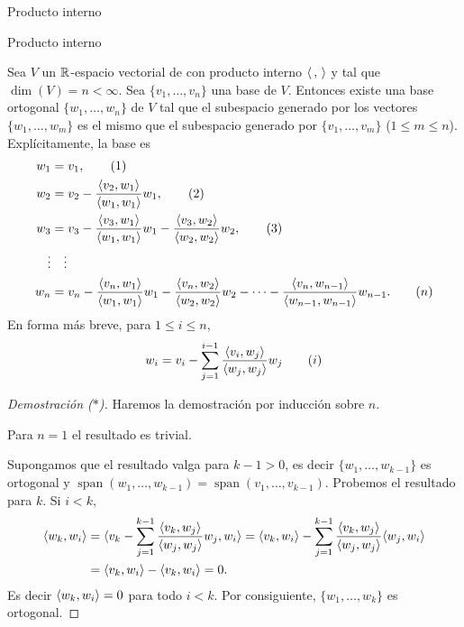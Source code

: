 \begin{chapter}{Producto interno}
\begin{section}{Producto interno}
        \begin{proposicion}
            Sea $V$  un $\mathbb R$-espacio vectorial de con producto interno $\langle \,,\,\rangle$ y tal que $\dim(V) = n < \infty$. 
            Sea $\{v_1,\ldots,v_n\}$ una base de $V$. Entonces existe una base ortogonal $\{w_1,\ldots, w_n\}$ de $V$ tal que el subespacio generado por los vectores $\{w_1,\ldots, w_m\}$ es el mismo que el subespacio generado por $\{v_1,\ldots, v_m\}$ ($1\le m \le n$). Explícitamente, la base es
            \begin{align}
            w_1 &= v_1, \tag{1} \\
            w_2 &= v_2 - \frac{\langle v_2,w_1\rangle}{\langle w_1,w_1\rangle}w_1, \tag{2}\\
            w_3 &= v_3 - \frac{\langle v_3,w_1\rangle}{\langle w_1,w_1\rangle}w_1- \frac{\langle v_3,w_2\rangle}{\langle w_2,w_2\rangle}w_2,\tag{3} \\
            \vdots &\quad \vdots \notag \\
            w_n &= v_n - \frac{\langle v_n,w_1\rangle}{\langle w_1,w_1\rangle}w_1- \frac{\langle v_n,w_2\rangle}{\langle w_2,w_2\rangle}w_2 - \cdots - \frac{\langle v_n,w_{n-1}\rangle}{\langle w_{n-1},w_{n-1}\rangle}w_{n-1}.\tag{$n$}	
            \end{align}
            En forma más breve, para $1 \le i \le n$, 
            \begin{equation}
            w_i = v_i - \sum_{j = 1}^{i-1} \frac{\langle v_i,w_{j}\rangle}{\langle w_{j},w_{j}\rangle}w_{j} \tag{$i$}
            \end{equation}
        \end{proposicion} 
        \begin{proof}[Demostración ($*$)]
            
            
            Haremos la demostración por inducción sobre $n$. 
            
            Para $n= 1$ el resultado es trivial.
            
            Supongamos que el resultado valga para $k-1>0$, es decir  $\{w_1,\ldots, w_{k-1}\}$ es ortogonal y 
            $\operatorname{span}(w_1,\ldots, w_{k-1}) = \operatorname{span}(v_1,\ldots, v_{k-1})$. Probemos el resultado para $k$.  Si  $i < k$, 
            \begin{align*}
            \langle w_k, w_i \rangle &= \langle  v_k - \sum_{j = 1}^{k-1} \frac{\langle v_k,w_{j}\rangle}{\langle w_{j},w_{j}\rangle}w_{j} , w_i \rangle 
            = \langle v_k, w_i\rangle -  \sum_{j = 1}^{k-1} \frac{\langle v_k,w_{j}\rangle}{\langle w_{j},w_{j}\rangle}\langle w_{j} , w_i \rangle \\
            &=  \langle v_k, w_i\rangle -  \langle v_k, w_i\rangle = 0.
            \end{align*}
            Es decir $	\langle w_k, w_i \rangle =0$ para todo $i < k$. Por consiguiente,  $\{w_1,\ldots, w_{k}\}$ es ortogonal.
            

\end{proof}
\end{section}
\end{chapter}

